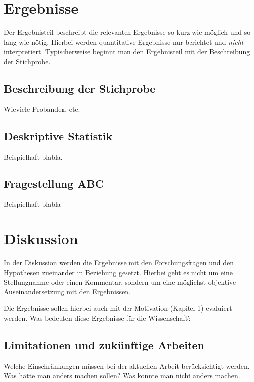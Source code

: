 \section{Ergebnisse}
Der Ergebnisteil beschreibt die relevanten Ergebnisse so kurz wie möglich und so lang wie nötig. Hierbei werden quantitative Ergebnisse nur berichtet und \textit{nicht} interpretiert.
Typischerweise beginnt man den Ergebnisteil mit der Beschreibung der Stichprobe.

\subsection{Beschreibung der Stichprobe}
Wieviele Probanden, etc.

\subsection{Deskriptive Statistik}
Beispielhaft blabla.



\subsection{Fragestellung ABC}
Beispielhaft blabla







\section{Diskussion}
In der Diskussion werden die Ergebnisse mit den Forschungsfragen und den Hypothesen zueinander in Beziehung gesetzt. Hierbei geht es nicht um eine Stellungnahme oder einen Kommentar, sondern um eine möglichst objektive Auseinandersetzung mit den Ergebnissen.

Die Ergebnisse sollen hierbei auch mit der Motivation (Kapitel 1) evaluiert werden. Was bedeuten diese Ergebnisse für die Wissenschaft?




\subsection{Limitationen und zukünftige Arbeiten}
Welche Einschränkungen müssen bei der aktuellen Arbeit berücksichtigt werden. Was hätte man anders machen sollen? Was konnte man nicht anders machen.

